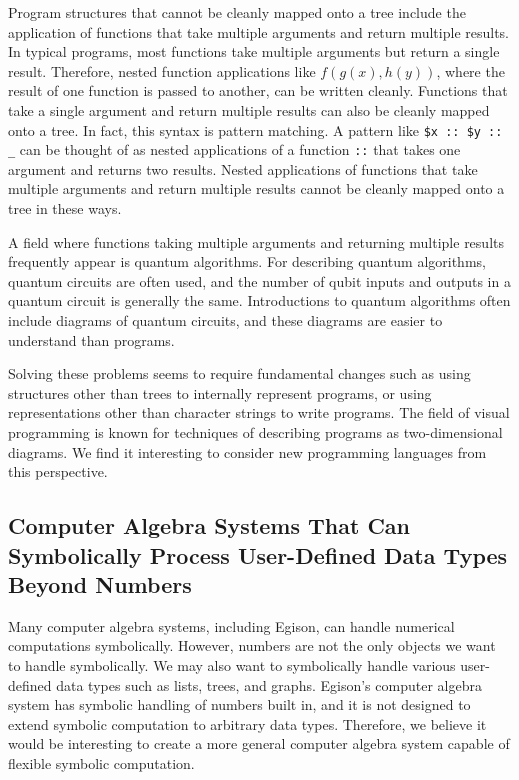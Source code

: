 Program structures that cannot be cleanly mapped onto a tree include the application of functions that take multiple arguments and return multiple results.
In typical programs, most functions take multiple arguments but return a single result.
Therefore, nested function applications like $f(g(x),h(y))$, where the result of one function is passed to another, can be written cleanly.
Functions that take a single argument and return multiple results can also be cleanly mapped onto a tree.
In fact, this syntax is pattern matching.
A pattern like \lstinline{$x :: $y :: _} can be thought of as nested applications of a function \lstinline{::} that takes one argument and returns two results.
Nested applications of functions that take multiple arguments and return multiple results cannot be cleanly mapped onto a tree in these ways.

A field where functions taking multiple arguments and returning multiple results frequently appear is quantum algorithms.
For describing quantum algorithms, quantum circuits are often used, and the number of qubit inputs and outputs in a quantum circuit is generally the same.
Introductions to quantum algorithms often include diagrams of quantum circuits, and these diagrams are easier to understand than programs.

Solving these problems seems to require fundamental changes such as using structures other than trees to internally represent programs, or using representations other than character strings to write programs.
The field of visual programming is known for techniques of describing programs as two-dimensional diagrams.
We find it interesting to consider new programming languages from this perspective.

\subsection{Computer Algebra Systems That Can Symbolically Process User-Defined Data Types Beyond Numbers}

Many computer algebra systems, including Egison, can handle numerical computations symbolically.
However, numbers are not the only objects we want to handle symbolically.
We may also want to symbolically handle various user-defined data types such as lists, trees, and graphs.
Egison's computer algebra system has symbolic handling of numbers built in, and it is not designed to extend symbolic computation to arbitrary data types.
Therefore, we believe it would be interesting to create a more general computer algebra system capable of flexible symbolic computation.

